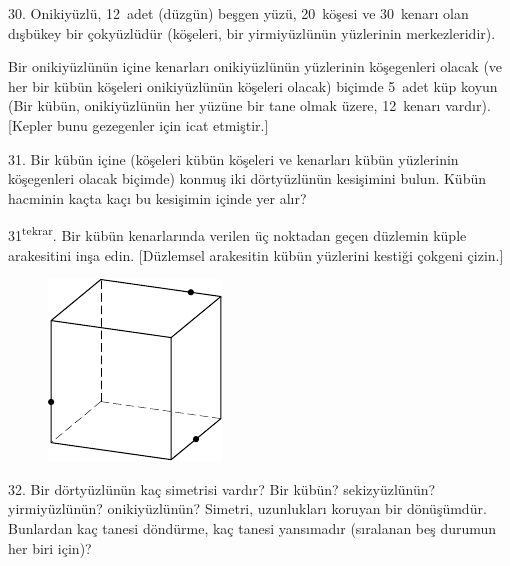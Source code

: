 \begin{problem}{30.}
	Onikiyüzlü, 12~adet (düzgün) beşgen yüzü, 20~köşesi ve 30~kenarı olan dışbükey bir çokyüzlüdür (köşeleri, bir yirmiyüzlünün yüzlerinin merkezleridir).

Bir onikiyüzlünün içine kenarları onikiyüzlünün yüzlerinin kö\-şe\-gen\-leri olacak (ve her bir kübün köşeleri onikiyüzlünün köşeleri olacak) biçimde 5~adet küp koyun (Bir kübün, onikiyüzlünün her yüzüne bir tane olmak üzere, 12~kenarı vardır). [Kepler bunu gezegenler için icat etmiştir.]
\end{problem}

\begin{problem}{31.}
	Bir kübün içine (köşeleri kübün köşeleri ve kenarları kübün yüz\-le\-ri\-nin köşegenleri olacak biçimde) konmuş iki dörtyüzlünün kesişimini bulun.
Kübün hacminin kaçta kaçı bu kesişimin içinde yer alır?
\end{problem}


\begin{problem}{31\textsuperscript{tekrar}.}
Bir kübün kenarlarında verilen üç noktadan geçen düzlemin küple arakesitini inşa edin. [Düzlemsel arakesitin kübün yüzlerini kes\-ti\-ği çokgeni çizin.]
	\begin{figure}
		\includegraphics{resources/taskbook-15}
	\end{figure}
\end{problem}


\begin{problem}{32.}
Bir dörtyüzlünün kaç simetrisi vardır? Bir kübün? sekizyüzlünün? yirmiyüzlünün? onikiyüzlünün? Simetri, uzunlukları koruyan bir dö\-nü\-şüm\-dür.
Bunlardan kaç tanesi döndürme, kaç tanesi yansımadır (sıralanan beş durumun her biri için)? 
\end{problem}

